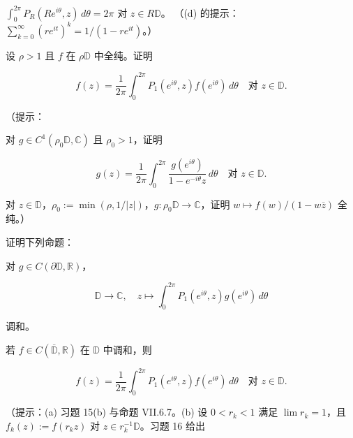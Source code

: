 \begin{exercises}
\begin{items}
\item

$ \int_0^{2\pi} P_R(Re^{i\theta}, z)\,d\theta = 2\pi $ 对 $ z \in R\mathbb{D} $。
（(d) 的提示：$ \sum_{k=0}^{\infty}(re^{it})^k = 1/(1 - re^{it}) $。）

\end{items}

\item

设 $ \rho > 1 $ 且 $ f $ 在 $ \rho\mathbb{D} $ 中全纯。证明

\[
f(z) = \frac{1}{2\pi}\int_0^{2\pi} P_1(e^{i\theta}, z)f(e^{i\theta})\,d\theta \quad \text{对 } z \in \mathbb{D} .
\]

（提示：

\begin{subitems}
\item

对 $ g \in C^1(\rho_0\mathbb{D},\mathbb{C}) $ 且 $ \rho_0 > 1 $，证明

\[
g(z) = \frac{1}{2\pi}\int_0^{2\pi} \frac{g(e^{i\theta})}{1 - e^{-i\theta}z}\,d\theta \quad \text{对 } z \in \mathbb{D} .
\]
\item

对 $ z \in \mathbb{D} $，$ \rho_0 := \min(\rho, 1/|z|) $，$ g : \rho_0\mathbb{D} \to \mathbb{C} $，证明 $ w \mapsto f(w)/(1 - w\overline{z}) $ 全纯。）

\end{subitems}

\item

证明下列命题：

\begin{items}
\item

对 $ g \in C(\partial\mathbb{D},\mathbb{R}) $，

\[
\mathbb{D} \to \mathbb{C} , \quad z \mapsto \int_0^{2\pi} P_1(e^{i\theta}, z)g(e^{i\theta})\,d\theta
\]

调和。

\item

若 $ f \in C(\overline{\mathbb{D}},\mathbb{R}) $ 在 $ \mathbb{D} $ 中调和，则

\[
f(z) = \frac{1}{2\pi}\int_0^{2\pi} P_1(e^{i\theta}, z)f(e^{i\theta})\,d\theta \quad \text{对 } z \in \mathbb{D} .
\]

（提示：(a) 习题 15(b) 与命题 VII.6.7。(b) 设 $ 0 < r_k < 1 $ 满足 $ \lim r_k = 1 $，且 $ f_k(z) := f(r_k z) $ 对 $ z \in r_k^{-1}\mathbb{D} $。习题 16 给出


\end{items}
\end{exercises}
